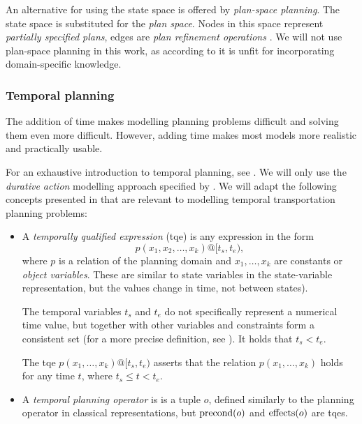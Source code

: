 An alternative for using the state space is offered by \textit{plan-space planning}.
The state space is substituted for the \textit{plan space}.
Nodes in this space represent \textit{partially specified plans},
edges are \textit{plan refinement operations} \citep[Section~5.1]{Ghallab2004}.
We will not use plan-space planning in this work, as according to
\citet[Section~5.6]{Ghallab2004} it is unfit for
incorporating domain-specific knowledge.

\subsubsection{Temporal planning}

The addition of time makes modelling planning problems difficult and
solving them even more difficult.
However, adding time makes most models more realistic and practically usable.

For an exhaustive introduction to temporal planning, see \citet[Chapter~13~and~14]{Ghallab2004}. We will only use the \textit{durative action} modelling approach
specified by \citet[Section~5]{Fox2003}. We will adapt the following concepts presented
in \citet[Section~14.2]{Ghallab2004} that are relevant to modelling temporal transportation planning problems:
\begin{itemize}
\item A \textit{temporally qualified expression} (tqe) is any
expression in the form $$p(x_1, x_2, \ldots, x_k)@[t_s, t_e),$$ where $p$
is a relation of the planning domain and $x_1, \ldots, x_k$ are constants or \textit{object
variables}. These are similar to state variables in the state-variable representation,
but the values change in time, not between states).

The temporal variables $t_s$ and $t_e$ do not specifically represent a numerical time value, but together with other variables and constraints form a consistent set (for a more precise definition, see \citet[Section~14.2.1]{Ghallab2004}).
It holds that $t_s < t_e$.

The tqe $p(x_1, \ldots, x_k)@[t_s, t_e)$
asserts that the relation $p(x_1, \ldots, x_k)$ holds for any time $t$, where
$t_s \leq t < t_e$.

\item A \textit{temporal planning operator} is is a tuple $o$, defined similarly to the planning operator in classical representations, but $\operatorname{\textrm{precond}}(o)$ and $\operatorname{\textrm{effects}}(o)$ are tqes.
\end{itemize}



